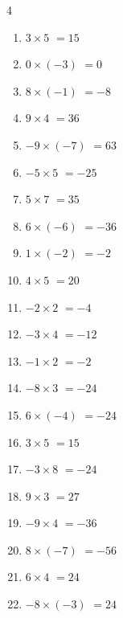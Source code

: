 \begin{multicols}{4}
\begin{enumerate}
  \item $3\times 5$
        $=15$

  \item $0\times (-3)$
        $=0$

  \item $8\times (-1)$
        $=-8$

  \item $9\times 4$
        $=36$

  \item $-9\times (-7)$
        $=63$

  \item $-5\times 5$
        $=-25$

  \item $5\times 7$
        $=35$

  \item $6\times (-6)$
        $=-36$

  \item $1\times (-2)$
        $=-2$

  \item $4\times 5$
        $=20$

  \item $-2\times 2$
        $=-4$

  \item $-3\times 4$
        $=-12$

  \item $-1\times 2$
        $=-2$

  \item $-8\times 3$
        $=-24$

  \item $6\times (-4)$
        $=-24$

  \item $3\times 5$
        $=15$

  \item $-3\times 8$
        $=-24$

  \item $9\times 3$
        $=27$

  \item $-9\times 4$
        $=-36$

  \item $8\times (-7)$
        $=-56$

  \item $6\times 4$
        $=24$

\columnbreak %

  \item $-8\times (-3)$
        $=24$


\end{enumerate}
\end{multicols}
